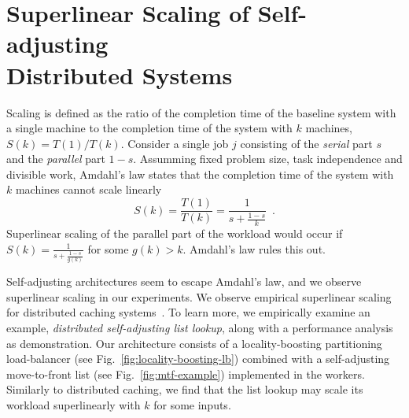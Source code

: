 

\section{Superlinear Scaling of Self-adjusting\\ Distributed Systems}



\label{sec:arch-scaling}


Scaling is defined as the ratio of the completion time of the baseline system with a single machine to the completion time of the system with $k$ machines, $S(k) = T(1) / T(k)$.
Consider a single job $j$ consisting of the \emph{serial} part $s$ and the \emph{parallel} part $1-s$.
Assumming fixed problem size, task independence and divisible work, Amdahl's law states that the completion time of the system with $k$ machines cannot scale linearly
\begin{equation}\label{eq:mtf-perf}
  S(k) = \frac{T(1)}{T(k)} = \frac1{s + \frac{1-s}{k}} \enspace .
\end{equation}
Superlinear scaling of the parallel part of the workload would occur if $S(k) = \frac1{s + \frac{1-s}{g(k)}}$ for some $g(k) > k$. Amdahl's law rules this out.


Self-adjusting architectures seem to escape Amdahl's law, and we observe superlinear scaling in our experiments.
We observe empirical superlinear scaling for distributed caching systems~\cite{271208, 10.5555/1012889.1012894, dobb-2}. To learn more, we empirically examine an example, \emph{distributed self-adjusting list lookup}, along with a performance analysis as demonstration. Our architecture consists of a locality-boosting partitioning load-balancer (see Fig.~\ref{fig:locality-boosting-lb}) combined with a self-adjusting move-to-front list (see Fig.~\ref{fig:mtf-example}) implemented in the workers.
Similarly to distributed caching, we find that the list lookup may scale its workload superlinearly with $k$ for some inputs.


